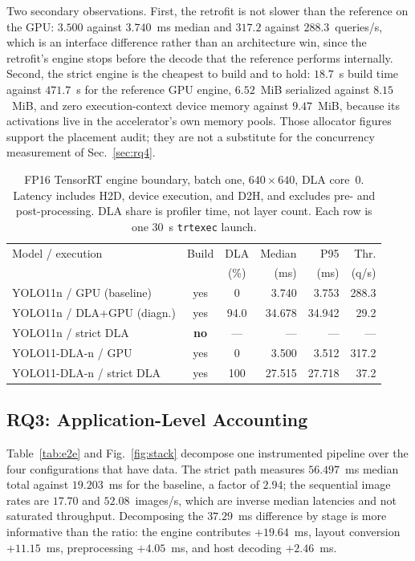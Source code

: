 Two secondary observations. First, the retrofit is not slower than the reference
on the GPU: $3.500$ against $3.740$~ms median and $317.2$ against
$288.3$~queries/s, which is an interface difference rather than an architecture
win, since the retrofit's engine stops before the decode that the reference
performs internally. Second, the strict engine is the cheapest to build and to
hold: $18.7$~s build time against $471.7$~s for the reference GPU engine,
$6.52$~MiB serialized against $8.15$~MiB, and zero execution-context device
memory against $9.47$~MiB, because its activations live in the accelerator's own
memory pools. Those allocator figures support the placement audit; they are not
a substitute for the concurrency measurement of Sec.~\ref{sec:rq4}.

\begin{table}[t]
\caption{FP16 TensorRT engine boundary, batch one, $640\times640$, DLA core~0.
Latency includes H2D, device execution, and D2H, and excludes pre- and
post-processing. DLA share is profiler time, not layer count. Each row is one
30~s \texttt{trtexec} launch.}
\label{tab:engine}
\centering
\scriptsize
\setlength{\tabcolsep}{2.0pt}
\begin{tabular}{lccrrr}
\toprule
Model / execution & Build & DLA & Median & P95 & Thr. \\
                  &       & (\%) & (ms)  & (ms) & (q/s) \\
\midrule
YOLO11n / GPU (baseline)   & yes & 0    & 3.740  & 3.753  & 288.3 \\
YOLO11n / DLA+GPU (diagn.) & yes & 94.0 & 34.678 & 34.942 & 29.2 \\
YOLO11n / strict DLA       & \textbf{no} & --- & --- & --- & --- \\
YOLO11-DLA-n / GPU         & yes & 0    & 3.500  & 3.512  & 317.2 \\
YOLO11-DLA-n / strict DLA  & yes & 100  & 27.515 & 27.718 & 37.2 \\
\bottomrule
\end{tabular}
\end{table}

\subsection{RQ3: Application-Level Accounting}
\label{sec:rq3}



Table~\ref{tab:e2e} and Fig.~\ref{fig:stack} decompose one instrumented
pipeline over the four configurations that have data. The strict path measures
$56.497$~ms median total against $19.203$~ms for the baseline, a factor of
$2.94$; the sequential image rates are $17.70$ and $52.08$~images/s, which are
inverse median latencies and not saturated throughput. Decomposing the
$37.29$~ms difference by stage is more informative than the ratio: the engine
contributes $+19.64$~ms, layout conversion $+11.15$~ms, preprocessing
$+4.05$~ms, and host decoding $+2.46$~ms.

